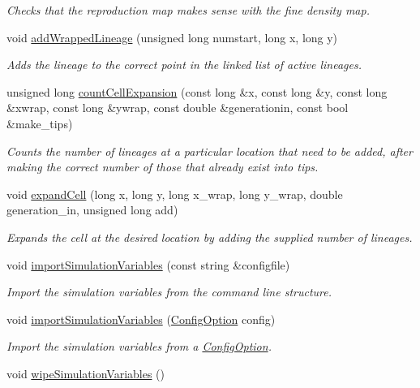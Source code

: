 \begin{DoxyCompactItemize}
\begin{DoxyCompactList}\small\item\em Checks that the reproduction map makes sense with the fine density map. \end{DoxyCompactList}\item 
void \hyperlink{class_spatial_tree_a5b26973b7f2dd3ca842a2eb8d2957896}{add\+Wrapped\+Lineage} (unsigned long numstart, long x, long y)
\begin{DoxyCompactList}\small\item\em Adds the lineage to the correct point in the linked list of active lineages. \end{DoxyCompactList}\item 
unsigned long \hyperlink{class_spatial_tree_a706ec7831f8c68e9245c00ebab76414f}{count\+Cell\+Expansion} (const long \&x, const long \&y, const long \&xwrap, const long \&ywrap, const double \&generationin, const bool \&make\+\_\+tips)
\begin{DoxyCompactList}\small\item\em Counts the number of lineages at a particular location that need to be added, after making the correct number of those that already exist into tips. \end{DoxyCompactList}\item 
void \hyperlink{class_spatial_tree_ac986898035a4c5c159cc6db19092c159}{expand\+Cell} (long x, long y, long x\+\_\+wrap, long y\+\_\+wrap, double generation\+\_\+in, unsigned long add)
\begin{DoxyCompactList}\small\item\em Expands the cell at the desired location by adding the supplied number of lineages. \end{DoxyCompactList}\item 
void \hyperlink{class_tree_a455d87022772b309a5974ea5f0295139}{import\+Simulation\+Variables} (const string \&configfile)
\begin{DoxyCompactList}\small\item\em Import the simulation variables from the command line structure. \end{DoxyCompactList}\item 
void \hyperlink{class_tree_a029af5f2dc1e33b4eead8110090ac778}{import\+Simulation\+Variables} (\hyperlink{class_config_option}{Config\+Option} config)
\begin{DoxyCompactList}\small\item\em Import the simulation variables from a \hyperlink{class_config_option}{Config\+Option}. \end{DoxyCompactList}\item 
void \hyperlink{class_tree_aa31508ea6d5801c6dee17c035f393b60}{wipe\+Simulation\+Variables} ()\hypertarget{class_tree_aa31508ea6d5801c6dee17c035f393b60}{}\label{class_tree_aa31508ea6d5801c6dee17c035f393b60}


\end{DoxyCompactItemize}
